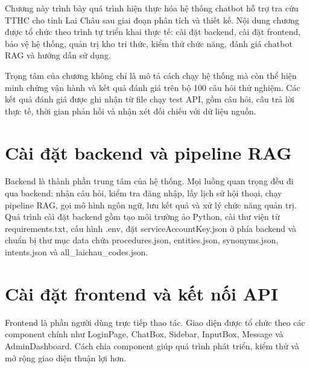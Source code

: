 Chương này trình bày quá trình hiện thực hóa hệ thống chatbot hỗ trợ tra
cứu TTHC cho tỉnh Lai Châu sau giai đoạn phân tích và thiết kế. Nội dung
chương được tổ chức theo trình tự triển khai thực tế: cài đặt backend,
cài đặt frontend, bảo vệ hệ thống, quản trị kho tri thức, kiểm thử chức
năng, đánh giá chatbot RAG và hướng dẫn sử dụng.

Trọng tâm của chương không chỉ là mô tả cách chạy hệ thống mà còn thể
hiện minh chứng vận hành và kết quả đánh giá trên bộ 100 câu hỏi thử
nghiệm. Các kết quả đánh giá được ghi nhận từ file chạy test API, gồm
câu hỏi, câu trả lời thực tế, thời gian phản hồi và nhận xét đối chiếu
với dữ liệu nguồn.

\section{Cài đặt backend và pipeline
RAG}

Backend là thành phần trung tâm của hệ thống. Mọi luồng quan trọng đều
đi qua backend: nhận câu hỏi, kiểm tra đăng nhập, lấy lịch sử hội thoại,
chạy pipeline RAG, gọi mô hình ngôn ngữ, lưu kết quả và xử lý chức năng
quản trị. Quá trình cài đặt backend gồm tạo môi trường ảo Python, cài
thư viện từ requirements.txt, cấu hình .env, đặt serviceAccountKey.json
ở phía backend và chuẩn bị thư mục data chứa procedures.json,
entities.json, synonyms.json, intents.json và all\_laichau\_codes.json.

\section{Cài đặt frontend và kết nối
API}

Frontend là phần người dùng trực tiếp thao tác. Giao diện được tổ chức
theo các component chính như LoginPage, ChatBox, Sidebar, InputBox,
Message và AdminDashboard. Cách chia component giúp quá trình phát
triển, kiểm thử và mở rộng giao diện thuận lợi hơn.

